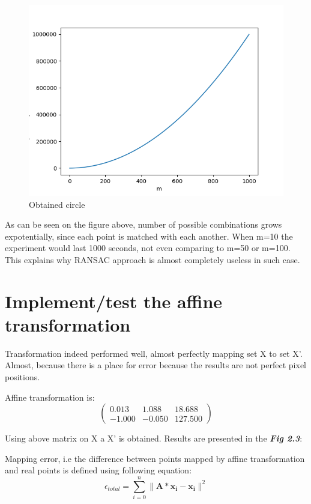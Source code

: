 \documentclass[notitlepage,english]{hgbreport}
\begin{document}
\begin{figure}[!htbp]
\includegraphics{assignment02_ramsac}
\caption{Obtained circle}
\end{figure}
As can be seen on the figure above, number of possible combinations grows expotentially, since each point is matched with each another. When m=10 the experiment would last 1000 seconds, not even comparing to m=50 or m=100. This explains why RANSAC approach is almost completely useless in such case. 



\section {Implement/test the affine transformation}




Transformation indeed performed well, almost perfectly mapping set X to set X'. Almost, because there is a place for error because the results are not perfect pixel positions. 

Affine transformation is:
\begin{equation}
\begin{pmatrix} 0.013 & 1.088 & 18.688 \\ -1.000 &  -0.050 & 127.500  \end{pmatrix}
\end{equation}


Using above matrix on X a X' is obtained. Results are presented in the \textit{\textbf{Fig 2.3}}:

Mapping error, i.e the difference between points mapped by affine transformation and real points is defined using following equation:
\begin{equation}
\epsilon_{total}=\sum_{i=0}^{n}\|\bm{A}*\bm{x_{i}}-\bm{x_{i}}\|^2
\end{equation}
\end{document}
